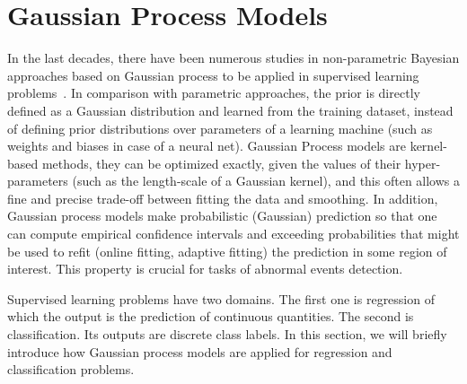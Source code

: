 


\section{Gaussian Process Models}
\label{bg:gp}
In the last decades, there have been numerous studies in non-parametric Bayesian approaches based on Gaussian process to be applied in supervised learning problems~\cite{rasmussen2006gaussian}. 
In comparison with parametric approaches, the prior is directly defined as a Gaussian distribution and learned from the training dataset, instead of defining prior distributions over parameters of a learning machine (such as weights and biases in case of a neural net).  Gaussian Process models are kernel-based methods, they can be optimized exactly, given the values of their hyper-parameters (such as the length-scale of a Gaussian kernel), and this often allows a fine and precise trade-off between fitting the data and smoothing. 
In addition, Gaussian process models make probabilistic (Gaussian) prediction so that one can compute empirical confidence intervals and exceeding probabilities that might be used to refit (online fitting, adaptive fitting) the prediction in some region of interest. 
This property is crucial for tasks of abnormal events detection.

Supervised learning problems have two domains. The first one is regression of which the output is the prediction of continuous quantities. The second is classification. Its outputs are discrete class labels. In this section, we will briefly introduce how Gaussian process models are applied for regression and classification problems. 

